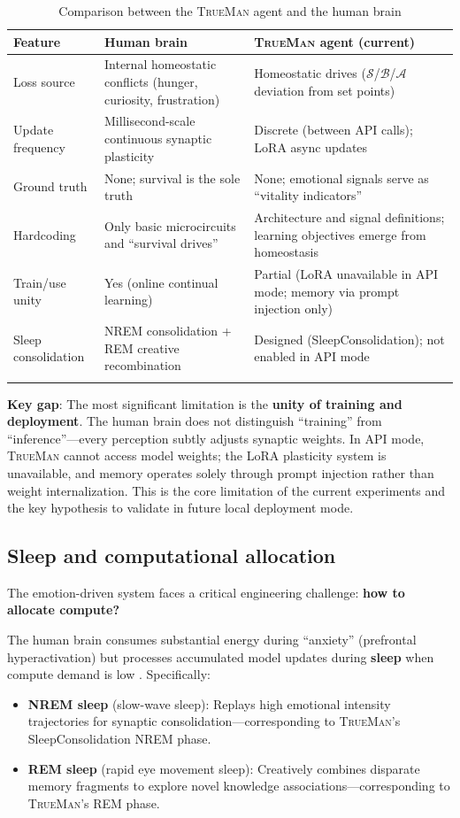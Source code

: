 \documentclass[pdflatex,sn-mathphys-num]{sn-jnl}
\newcommand{\TrueMan}{\textsc{TrueMan}}
\newcommand{\surprise}{\mathcal{S}}
\newcommand{\boredom}{\mathcal{B}}
\newcommand{\anxiety}{\mathcal{A}}
\theoremstyle{thmstyleone}%
\theoremstyle{thmstyletwo}%
\theoremstyle{thmstylethree}%
\begin{document}
\begin{table}[h]
\caption{Comparison between the \TrueMan{} agent and the human brain}\label{tab:brain_comparison}%
\small
\begin{tabular}{@{}p{2cm}p{4.5cm}p{5cm}@{}}
\toprule
Feature & Human brain & \TrueMan{} agent (current) \\
\midrule
Loss source & Internal homeostatic conflicts (hunger, curiosity, frustration) & Homeostatic drives ($\surprise$/$\boredom$/$\anxiety$ deviation from set points) \\
Update frequency & Millisecond-scale continuous synaptic plasticity & Discrete (between API calls); LoRA async updates \\
Ground truth & None; survival is the sole truth & None; emotional signals serve as ``vitality indicators'' \\
Hardcoding & Only basic microcircuits and ``survival drives'' & Architecture and signal definitions; learning objectives emerge from homeostasis \\
Train/use unity & Yes (online continual learning) & Partial (LoRA unavailable in API mode; memory via prompt injection only) \\
Sleep consolidation & NREM consolidation + REM creative recombination & Designed (SleepConsolidation); not enabled in API mode \\
\botrule
\end{tabular}
\end{table}

\textbf{Key gap}: The most significant limitation is the \textbf{unity of training and deployment}. The human brain does not distinguish ``training'' from ``inference''---every perception subtly adjusts synaptic weights. In API mode, \TrueMan{} cannot access model weights; the LoRA plasticity system is unavailable, and memory operates solely through prompt injection rather than weight internalization. This is the core limitation of the current experiments and the key hypothesis to validate in future local deployment mode.

\subsection{Sleep and computational allocation}

The emotion-driven system faces a critical engineering challenge: \textbf{how to allocate compute?}

The human brain consumes substantial energy during ``anxiety'' (prefrontal hyperactivation) but processes accumulated model updates during \textbf{sleep} when compute demand is low \cite{krishnan2019sleep}. Specifically:
\begin{itemize}[leftmargin=2em]
    \item \textbf{NREM sleep} (slow-wave sleep): Replays high emotional intensity trajectories for synaptic consolidation---corresponding to \TrueMan{}'s SleepConsolidation NREM phase.
    \item \textbf{REM sleep} (rapid eye movement sleep): Creatively combines disparate memory fragments to explore novel knowledge associations---corresponding to \TrueMan{}'s REM phase.
\end{itemize}
\end{document}
